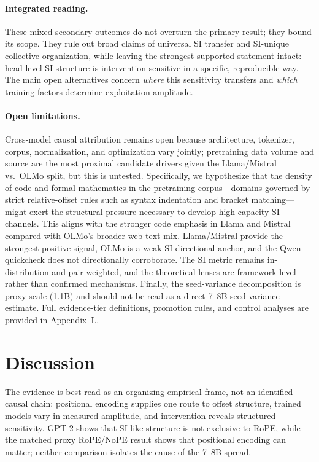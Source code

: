 \documentclass{article}
\begin{document}
\paragraph{Integrated reading.}
These mixed secondary outcomes do not overturn the primary result; they bound its scope. They rule out broad claims of universal SI transfer and SI-unique collective organization, while leaving the strongest supported statement intact: head-level SI structure is intervention-sensitive in a specific, reproducible way. The main open alternatives concern \emph{where} this sensitivity transfers and \emph{which} training factors determine exploitation amplitude.

\paragraph{Open limitations.}
Cross-model causal attribution remains open because architecture, tokenizer, corpus, normalization, and optimization vary jointly; pretraining data volume and source are the most proximal candidate drivers given the Llama/Mistral vs.\ OLMo split, but this is untested. Specifically, we hypothesize that the density of code and formal mathematics in the pretraining corpus---domains governed by strict relative-offset rules such as syntax indentation and bracket matching---might exert the structural pressure necessary to develop high-capacity SI channels. This aligns with the stronger code emphasis in Llama and Mistral compared with OLMo's broader web-text mix. Llama/Mistral provide the strongest positive signal, OLMo is a weak-SI directional anchor, and the Qwen quickcheck does not directionally corroborate. The SI metric remains in-distribution and pair-weighted, and the theoretical lenses are framework-level rather than confirmed mechanisms. Finally, the seed-variance decomposition is proxy-scale (1.1B) and should not be read as a direct 7--8B seed-variance estimate. Full evidence-tier definitions, promotion rules, and control analyses are provided in Appendix~L.

\section{Discussion}

The evidence is best read as an organizing empirical frame, not an identified causal chain: positional encoding supplies one route to offset structure, trained models vary in measured amplitude, and intervention reveals structured sensitivity. GPT-2 shows that SI-like structure is not exclusive to RoPE, while the matched proxy RoPE/NoPE result shows that positional encoding can matter; neither comparison isolates the cause of the 7--8B spread.
\end{document}
